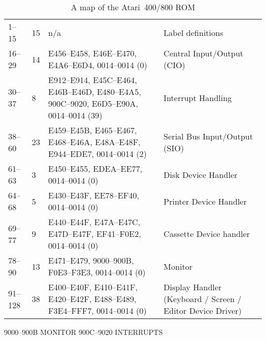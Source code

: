 \documentclass{article}
\begin{document}
\begin{table}
\begin{center}
\begin{tabular}{|l|l|l|l|}
\hline
1--15   & 15 & n/a                                                                                     & Label definitions             \\
16--29  & 14 & E456--E458, E46E--E470, E4A6--E6D4, 0014--0014 (0)                                      & Central Input/Output (CIO)    \\
30--37  &  8 & E912--E914, E45C--E464, E46B--E46D, E480--E4A5, 900C--9020, E6D5--E90A, 0014--0014 (39) & Interrupt Handling            \\
38--60  & 23 & E459--E45B, E465--E467, E468--E46A, E48A--E48F, E944--EDE7, 0014--0014 (2)              & Serial Bus Input/Output (SIO) \\
61--63  &  3 & E450--E455, EDEA--EE77, 0014--0014 (0)                                                  & Disk Device Handler           \\
64--68  &  5 & E430--E43F, EE78--EF40, 0014--0014 (0)                                                  & Printer Device Handler        \\
69--77  &  9 & E440--E44F, E47A--E47C, E47D--E47F, EF41--F0E2, 0014--0014 (0)                          & Cassette Device handler       \\
78--90  & 13 & E471--E479, 9000--900B, F0E3--F3E3, 0014--0014 (0)                                      & Monitor                       \\
91--128 & 38 & E400--E40F, E410--E41F, E420--E42F, E488--E489, F3E4--FFF7, 0014--0014 (0)              & Display Handler (Keyboard / Screen / Editor Device Driver) \\
\hline
\end{tabular}
\caption{A map of the Atari~400/800 ROM}
\end{center}
\end{table}

9000--900B MONITOR
900C--9020 INTERRUPTS
\end{document}
